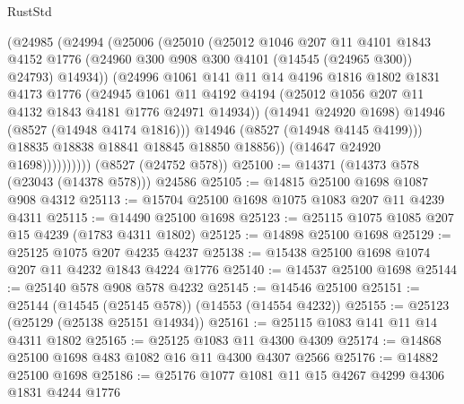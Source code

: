 \begin{lexlean}{RustStd}
\begin{coremodule}
                      (@24985
                        (@24994
                          (@25006
                            (@25010
                              (@25012
                                @1046
                                @207
                                @11
                                @4101
                                @1843
                                @4152
                                @1776
                                (@24960 @300 @908 @300 @4101 (@14545 (@24965 @300)) @24793)
                                @14934))
                            (@24996
                              @1061
                              @141
                              @11
                              @14
                              @4196
                              @1816
                              @1802
                              @1831
                              @4173
                              @1776
                              (@24945
                                @1061
                                @11
                                @4192
                                @4194
                                (@25012 @1056 @207 @11 @4132 @1843 @4181 @1776 @24971 @14934))
                              (@14941 @24920 @1698)
                              @14946
                              (@8527 (@14948 @4174 @1816)))
                            @14946
                            (@8527 (@14948 @4145 @4199)))
                          @18835
                          @18838
                          @18841
                          @18845
                          @18850
                          @18856))
                      (@14647 @24920 @1698))))))))))
    (@8527 (@24752 @578))
@25100 := @14371 (@14373 @578 (@23043 (@14378 @578))) @24586
@25105 := @14815 @25100 @1698 @1087 @908 @4312
@25113 := @15704 @25100 @1698 @1075 @1083 @207 @11 @4239 @4311
@25115 := @14490 @25100 @1698
@25123 := @25115 @1075 @1085 @207 @15 @4239 (@1783 @4311 @1802)
@25125 := @14898 @25100 @1698
@25129 := @25125 @1075 @207 @4235 @4237
@25138 := @15438 @25100 @1698 @1074 @207 @11 @4232 @1843 @4224 @1776
@25140 := @14537 @25100 @1698
@25144 := @25140 @578 @908 @578 @4232
@25145 := @14546 @25100
@25151 := @25144 (@14545 (@25145 @578)) (@14553 (@14554 @4232))
@25155 := @25123 (@25129 (@25138 @25151 @14934))
@25161 := @25115 @1083 @141 @11 @14 @4311 @1802
@25165 := @25125 @1083 @11 @4300 @4309
@25174 := @14868 @25100 @1698 @483 @1082 @16 @11 @4300 @4307 @2566
@25176 := @14882 @25100 @1698
@25186 := @25176 @1077 @1081 @11 @15 @4267 @4299 @4306 @1831 @4244 @1776

\end{coremodule}
\end{lexlean}
